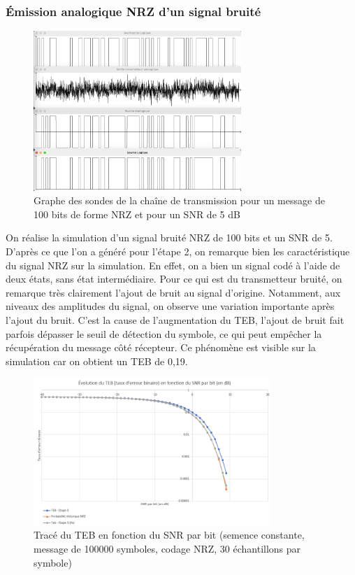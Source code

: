 \subsubsection{Émission analogique NRZ d'un signal bruité}

\begin{figure}[H]
    \centering
    \includegraphics[width=0.7\textwidth]{img/etape3_emission_NRZ_bruite.png}
    \caption{Graphe des sondes de la chaîne de transmission pour un message de 100 bits de forme NRZ et pour un SNR de 5 dB}
    \label{fig:etape_3_NRZ_bruite}
\end{figure}

On réalise la simulation d'un signal bruité NRZ de 100 bits et un SNR de 5. D'après ce que l'on a généré pour l'étape 2, on remarque bien les caractéristique du signal NRZ sur la simulation. En effet, on a bien un signal codé à l'aide de deux états, sans état intermédiaire. Pour ce qui est du transmetteur bruité, on remarque très clairement l'ajout de bruit au signal d'origine. Notamment, aux niveaux des amplitudes du signal, on observe une variation importante après l'ajout du bruit. C'est la cause de l'augmentation du TEB, l'ajout de bruit fait parfois dépasser le seuil de détection du symbole, ce qui peut empêcher la récupération du message côté récepteur. Ce phénomène est visible sur la simulation car on obtient un TEB de 0,19.

\begin{figure}[H]
    \centering
    \includegraphics[width=0.8\textwidth]{img/etape3_teb_fct_snr.png}
    \caption{Tracé du TEB en fonction du SNR par bit (semence constante, message de 100000 symboles, codage NRZ, 30 échantillons par symbole)}
    \label{fig:etape3_teb_fct_snr}
\end{figure}

